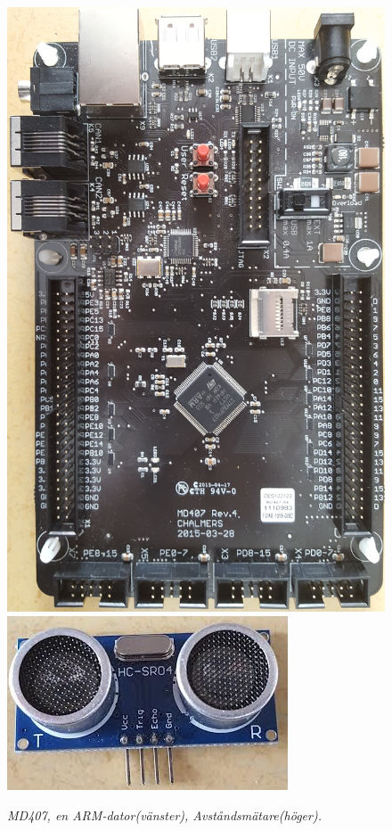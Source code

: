 \documentclass[a4paper]{article}
\begin{document}
\begin{figure}[H]
\includegraphics[scale=0.04]{MD407.jpg} \hspace{2mm}
\includegraphics[scale=1]{DistanceMeasurementFront.jpg}
\centering
\caption{\it MD407, en ARM-dator(vänster), Avståndsmätare(höger).}
\end{figure} 
\end{document}
